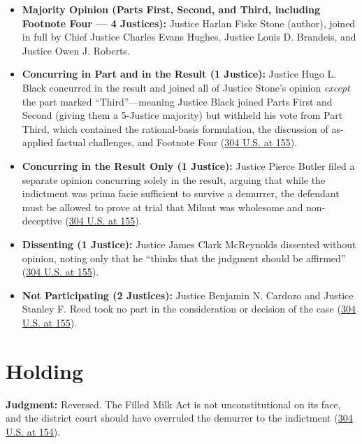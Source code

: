 \documentclass[12pt]{article}
\begin{document}
\begin{itemize}
    \item \textbf{Majority Opinion (Parts First, Second, and Third, including Footnote Four --- 4 Justices):} Justice Harlan Fiske Stone (author), joined in full by Chief Justice Charles Evans Hughes, Justice Louis D. Brandeis, and Justice Owen J. Roberts.
    \item \textbf{Concurring in Part and in the Result (1 Justice):} Justice Hugo L. Black concurred in the result and joined all of Justice Stone's opinion \textit{except} the part marked ``Third''---meaning Justice Black joined Parts First and Second (giving them a 5-Justice majority) but withheld his vote from Part Third, which contained the rational-basis formulation, the discussion of as-applied factual challenges, and Footnote Four (\href{https://supreme.justia.com/cases/federal/us/304/144/}{304 U.S. at 155}).
    \item \textbf{Concurring in the Result Only (1 Justice):} Justice Pierce Butler filed a separate opinion concurring solely in the result, arguing that while the indictment was prima facie sufficient to survive a demurrer, the defendant must be allowed to prove at trial that Milnut was wholesome and non-deceptive (\href{https://supreme.justia.com/cases/federal/us/304/144/}{304 U.S. at 155}).
    \item \textbf{Dissenting (1 Justice):} Justice James Clark McReynolds dissented without opinion, noting only that he ``thinks that the judgment should be affirmed'' (\href{https://supreme.justia.com/cases/federal/us/304/144/}{304 U.S. at 155}).
    \item \textbf{Not Participating (2 Justices):} Justice Benjamin N. Cardozo and Justice Stanley F. Reed took no part in the consideration or decision of the case (\href{https://supreme.justia.com/cases/federal/us/304/144/}{304 U.S. at 155}).
\end{itemize}

\section{Holding}

\textbf{Judgment:} Reversed. The Filled Milk Act is not unconstitutional on its face, and the district court should have overruled the demurrer to the indictment (\href{https://supreme.justia.com/cases/federal/us/304/144/}{304 U.S. at 154}).
\end{document}
